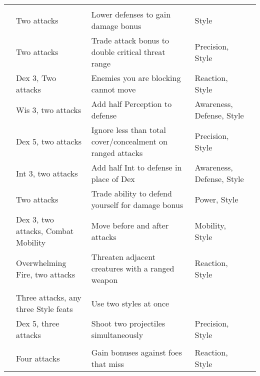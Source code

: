 {\begin{longtabu}{>{\lcol}p{10em} >{\lcol}p{15em} >{\lcol}X >{\lcol}p{6em} >{\lcol}p{3em}}
        \midrule
         &  &  &  &  \\
         & Two attacks & Lower defenses to gain damage bonus & Style &  \\
         & Two attacks & Trade attack bonus to double critical threat range & Precision, Style &  \\
         & Dex 3, Two attacks & Enemies you are blocking cannot move & Reaction, Style &  \\
         & Wis 3, two attacks & Add half Perception to defense & Awareness, Defense, Style &  \\
         & Dex 5, two attacks & Ignore less than total cover/concealment on ranged attacks & Precision, Style &  \\
         & Int 3, two attacks & Add half Int to defense in place of Dex & Awareness, Defense, Style &  \\
         & Two attacks & Trade ability to defend yourself for damage bonus & Power, Style &  \\
         & Dex 3, two attacks, Combat Mobility & Move before and after attacks & Mobility, Style &  \\
         & Overwhelming Fire, two attacks & Threaten adjacent creatures with a ranged weapon & Reaction, Style &  \\

        \midrule
         &  &  &  &  \\
         & Three attacks, any three Style feats & Use two styles at once & \x &  \\
         & Dex 5, three attacks & Shoot two projectiles simultaneously & Precision, Style &  \\

        \midrule
         &  &  &  &  \\
         & Four attacks & Gain bonuses against foes that miss & Reaction, Style&  \\
    \end{longtabu}
}%

